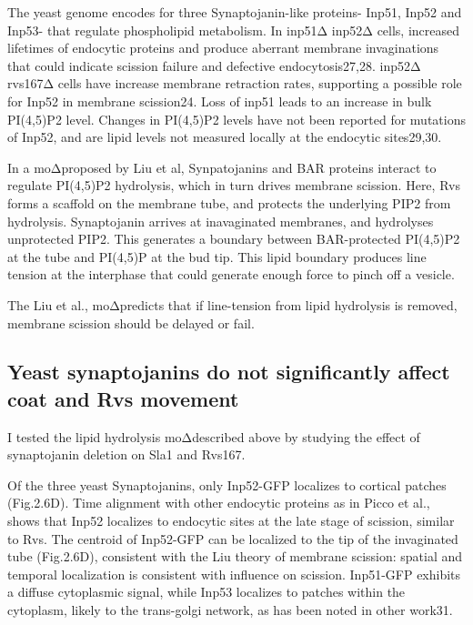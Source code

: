 The yeast genome encodes for three Synaptojanin-like proteins- Inp51, Inp52 and Inp53- that regulate phospholipid metabolism. In inp51Δ inp52Δ cells, increased lifetimes of endocytic proteins and produce aberrant membrane invaginations that could indicate scission failure and defective endocytosis27,28. inp52Δ rvs167Δ cells have increase membrane retraction rates, supporting a possible role for Inp52 in membrane scission24. Loss of inp51 leads to an increase in bulk PI(4,5)P2 level. Changes in PI(4,5)P2 levels have not been reported for mutations of Inp52, and are lipid levels not measured locally at the endocytic sites29,30.

In a moΔproposed by Liu et al, Synpatojanins and BAR proteins interact to regulate PI(4,5)P2 hydrolysis, which in turn drives membrane scission. Here, Rvs forms a scaffold on the membrane tube, and protects the underlying PIP2 from hydrolysis. Synaptojanin arrives at inavaginated membranes, and hydrolyses unprotected PIP2. This generates a boundary between BAR-protected PI(4,5)P2 at the tube and PI(4,5)P at the bud tip. This lipid boundary produces line tension at the interphase that could generate enough force to pinch off a vesicle. 

The Liu et al., moΔpredicts that if line-tension from lipid hydrolysis is removed, membrane scission should be delayed or fail.


	\subsection{Yeast synaptojanins do not significantly affect coat and Rvs movement } 

	
	
I tested the lipid hydrolysis moΔdescribed above by studying the effect of synaptojanin deletion on Sla1 and Rvs167. 

Of the three yeast Synaptojanins, only Inp52-GFP localizes to cortical patches (Fig.2.6D). Time alignment with other endocytic proteins as in Picco et al., shows that Inp52 localizes to endocytic sites at the late stage of scission, similar to Rvs. The centroid of Inp52-GFP can be localized to the tip of the invaginated tube (Fig.2.6D), consistent with the Liu theory of membrane scission: spatial and temporal localization is consistent with influence on scission. Inp51-GFP exhibits a diffuse cytoplasmic signal, while Inp53 localizes to patches within the cytoplasm, likely to the trans-golgi network, as has been noted in other work31. 
	\vspace{5mm}
	
